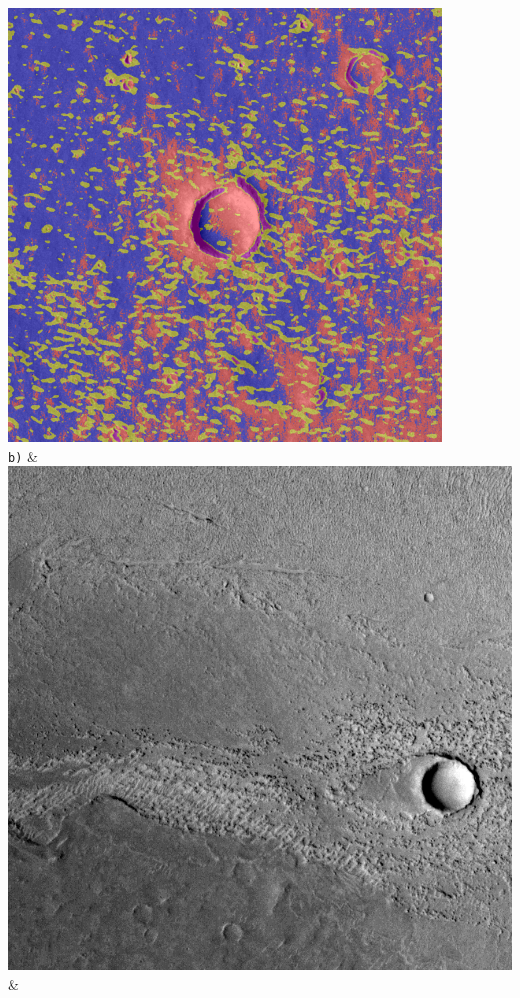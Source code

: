 \begin{table}[h!]
\begin{tabularx}{\textwidth}
		\includegraphics[width=0.9\linewidth]{images/gen/color_weight/p03_01.png_1.66.png} \\
		\texttt{b)} &
		\includegraphics[width=0.9\linewidth]{images/p03/p03_02.png} &

\end{tabularx}
\end{table}
